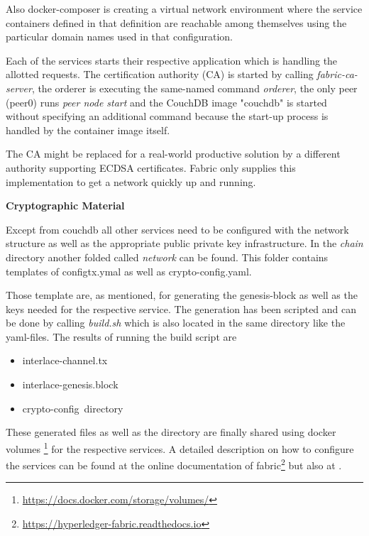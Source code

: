 Also docker-composer is creating a virtual network environment where the service containers defined in that definition are reachable among themselves using the particular domain names used in that configuration.

Each of the services starts their respective application which is handling the allotted requests. The certification authority (CA) is started by calling \textit{fabric-ca-server}, the orderer is executing the same-named command \textit{orderer}, the only peer (peer0) runs \textit{peer node start} and the CouchDB image "couchdb" is started without specifying an additional command because the start-up process is handled by the container image itself.   

The CA might be replaced for a real-world productive solution by a different authority supporting ECDSA certificates. Fabric only supplies this implementation to get a network quickly up and running.

\textbf{Cryptographic Material}

Except from couchdb all other services need to be configured with the network structure as well as the appropriate public private key infrastructure. In the \textit{chain} directory another folded called \textit{network} can be found. This folder contains templates of configtx.ymal as well as crypto-config.yaml. 

Those template are, as mentioned, for generating the genesis-block as well as the keys needed for the respective service. The generation has been scripted and can be done by calling \textit{build.sh} which is also located in the same directory like the yaml-files. The results of running the build script are

\begin{itemize}
	\item interlace-channel.tx
	\item interlace-genesis.block
	\item crypto-config\ directory
\end{itemize}

These generated files as well as the directory are finally shared using docker volumes \footnote{\url{https://docs.docker.com/storage/volumes/}} for the respective services. A detailed description on how to configure the services can be found at the online documentation of fabric\footnote{\url{https://hyperledger-fabric.readthedocs.io}} but also at \cite{HandsOnBlockchainHyperledger2018}.



